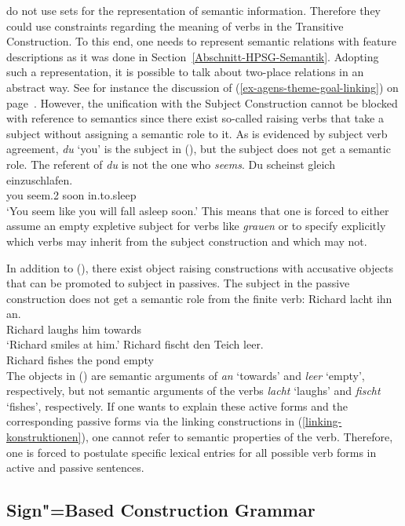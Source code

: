 \citet{MR2001a} do not use sets for the representation of semantic information. Therefore they could
use constraints regarding the meaning of verbs in the Transitive Construction. To this end, one needs
to represent semantic relations with feature descriptions as it was done in
Section~\ref{Abschnitt-HPSG-Semantik}. Adopting such a representation, it is possible to talk about
two-place relations in an abstract way. See for instance the discussion of
(\ref{ex-agens-theme-goal-linking}) on page~\pageref{ex-agens-theme-goal-linking}.
However, the unification with the Subject Construction cannot be blocked with reference to
semantics since there exist so-called raising verbs that take a subject without assigning a semantic role to it.
As is evidenced by subject verb agreement, \emph{du} `you' is the subject in (), but the
subject does not get a semantic role. The referent of \emph{du} is not the one who \emph{seems}.
\ea
\gll Du scheinst gleich einzuschlafen.\\
     you seem.2\sg{} soon in.to.sleep\\
\glt `You seem like you will fall asleep soon.'
\z
This means that one is forced to either assume an empty expletive subject for verbs like
\emph{grauen} or to specify explicitly which verbs may inherit from the subject construction and
which may not.

In addition to (), there exist object raising constructions with accusative objects that can
be promoted to subject in passives. The subject in the passive construction does not get a semantic
role from the finite verb:
\eal
\ex
\gll Richard lacht ihn an.\\
     Richard laughs him towards\\
\glt `Richard smiles at him.'
\ex
\gll Richard fischt den Teich leer.\\
     Richard fishes the pond empty\\
\zl
The objects in () are semantic arguments of \emph{an} `towards' and \emph{leer} `empty', respectively, but not
semantic arguments of the verbs \emph{lacht} `laughs' and \emph{fischt} `fishes', respectively.
If one wants to explain these active forms and the corresponding passive forms via the linking
constructions in (\ref{linking-konstruktionen}), one cannot refer to semantic properties of the
verb. Therefore, one is forced to postulate specific lexical entries for all possible verb forms in
active and passive sentences.


\subsection{Sign"=Based Construction Grammar}
\label{sec-SbCxG}\label{sec-sbcg}\label{sec-SBCG}

